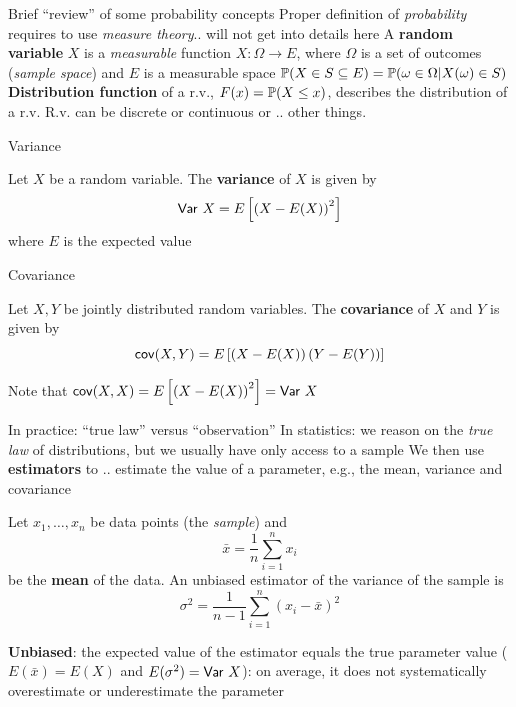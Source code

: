 \documentclass[aspectratio=169]{beamer}\usepackage[]{graphicx}\usepackage[]{xcolor}
\begin{document}
\begin{frame}{Brief ``review'' of some probability concepts}
Proper definition of \emph{probability} requires to use \emph{measure theory}.. will not get into details here
\vfill
A \textbf{random variable} $X$ is a \emph{measurable} function $X:\Omega\to E$, where $\Omega$ is a set of outcomes (\emph{sample space}) and $E$ is a measurable space
\vfill
$\mathbb{P}(X\in S\subseteq E) = \mathbb{P}(\omega\in\Omega|X(\omega)\in S)$
\vfill
\textbf{Distribution function} of a r.v., $F(x)=\mathbb{P}(X\leq x)$, describes the distribution of a r.v.
\vfill
R.v. can be discrete or continuous or .. other things. 
\end{frame}

\begin{frame}{Variance}
\begin{definition}[Variance]
Let $X$ be a random variable. The \textbf{variance} of $X$ is given by
\[
\mathsf{Var}\  X = E\left[\left(X-E(X)\right)^2\right]
\]
where $E$ is the expected value
\end{definition}
\end{frame}

\begin{frame}{Covariance}
\begin{definition}[Covariance]
Let $X,Y$ be jointly distributed random variables. The \textbf{covariance} of $X$ and $Y$ is given by
\[
\mathsf{cov} (X,Y) = E\left[\left(X-E(X)\right)\left(Y-E(Y)\right)\right]
\]
\end{definition}
\vfill
Note that $\mathsf{cov}(X,X)=E\left[\left(X-E(X)\right)^2\right] = \mathsf{Var}\  X$
\end{frame}

\begin{frame}{In practice: ``true law'' versus ``observation''}
In statistics: we reason on the \emph{true law} of distributions, but we usually have only access to a sample
\vfill
We then use \textbf{estimators} to .. estimate the value of a parameter, e.g., the mean, variance and covariance
\vfill
\end{frame}
    
\begin{frame}
\begin{definition}
Let $x_1,\ldots,x_n$ be data points (the \emph{sample}) and 
\[
\bar x = \frac 1n \sum_{i=1}^n x_i
\]
be the \textbf{mean} of the data. An unbiased estimator of the variance of the sample is
\[
\sigma^2 = \frac{1}{n-1}\sum_{i=1}^n (x_i-\bar x)^2
\]
\end{definition}
\vfill
\textbf{Unbiased}: the expected value of the estimator equals the true parameter value ($E(\bar x) = E(X)$ and $E(\sigma^2) = \mathsf{Var}\  X$): on average, it does not systematically overestimate or underestimate the parameter
\end{frame}
\end{document}
